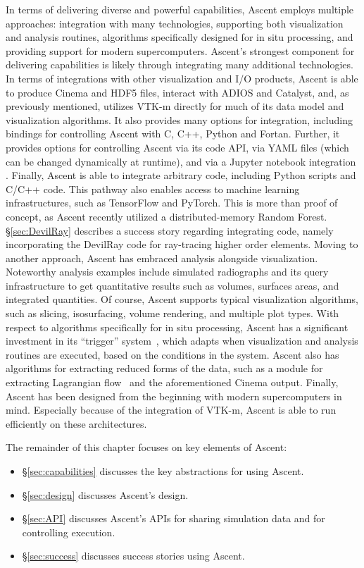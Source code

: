 In terms of delivering diverse and powerful capabilities,
Ascent employs multiple approaches:
integration with many technologies,
supporting both visualization and analysis routines,
algorithms specifically designed for in situ processing,
and providing support for modern supercomputers.
%
Ascent's strongest component for delivering capabilities is likely
through integrating many additional technologies.
%
In terms of integrations with other visualization and I/O products,
Ascent is able to produce Cinema and HDF5 files, interact with
ADIOS and Catalyst, and, as previously mentioned, utilizes VTK-m
directly for much of its data model and visualization algorithms.
%
It also provides many options for integration, including
bindings
for controlling Ascent with  C, C++, Python and Fortan.
%
Further, it provides options for controlling Ascent via its code API,
via YAML files (which can be changed dynamically at runtime), and via
a Jupyter notebook integration .
%
Finally, Ascent is able to integrate arbitrary code, including
Python scripts and C/C++ code.
%
This pathway also enables access to
machine learning infrastructures, such as TensorFlow and PyTorch.
%
This is more than proof of concept,
as Ascent recently utilized a distributed-memory Random Forest.
%
\S\ref{sec:DevilRay} describes a success story regarding integrating
code,
namely incorporating the DevilRay code for ray-tracing higher order
elements.
%
Moving to another approach, Ascent has embraced analysis alongside
visualization.
%
Noteworthy analysis examples include simulated radiographs and its
query infrastructure to get quantitative results such as volumes,
surfaces areas, and integrated quantities.
%
Of course, Ascent supports typical visualization algorithms, such as
slicing, isosurfacing, volume rendering, and multiple plot types.
%
With respect to algorithms specifically for in situ processing, Ascent
has a significant investment in its ``trigger'' system~\cite{Larsen:ISAV18},
which adapts when visualization and analysis routines are executed,
based on the conditions in the system.
%
Ascent also has algorithms for extracting reduced forms of the data,
such as a module for extracting Lagrangian flow~\cite{Agranovsky:LDAV2014,Sane:EGPGV19} and the
aforementioned Cinema output.
%
Finally, Ascent has been designed from the beginning with modern
supercomputers in mind.
%
Especially because of the integration of VTK-m, Ascent is able to
run efficiently on these architectures.

The remainder of this chapter focuses on key elements of Ascent:
\begin{itemize}
\item \S\ref{sec:capabilities} discusses the key abstractions for using Ascent.
\item \S\ref{sec:design} discusses Ascent's design.
\item \S\ref{sec:API} discusses Ascent's APIs for sharing simulation
data and for controlling execution.
\item \S\ref{sec:success} discusses success stories using Ascent.
\end{itemize}

